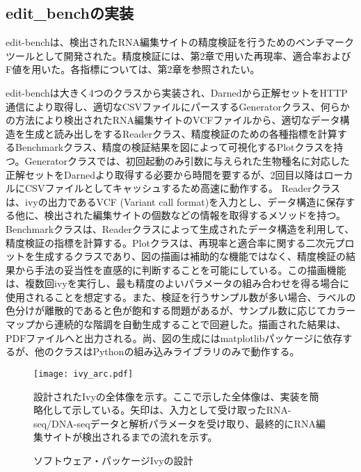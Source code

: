 \subsection{edit\_benchの実装}
edit-benchは、検出されたRNA編集サイトの精度検証を行うためのベンチマークツールとして開発された。精度検証には、第2章で用いた再現率、適合率およびF値を用いた。各指標については、第2章を参照されたい。
\par
edit-benchは大きく4つのクラスから実装され、Darnedから正解セットをHTTP通信により取得し、適切なCSVファイルにパースするGeneratorクラス、何らかの方法により検出されたRNA編集サイトのVCFファイルから、適切なデータ構造を生成と読み出しをするReaderクラス、精度検証のための各種指標を計算するBenchmarkクラス、精度の検証結果を図によって可視化するPlotクラスを持つ。Generatorクラスでは、初回起動のみ引数に与えられた生物種名に対応した正解セットをDarnedより取得する必要から時間を要するが、2回目以降はローカルにCSVファイルとしてキャッシュするため高速に動作する。
Readerクラスは、ivyの出力であるVCF (Variant call format)を入力とし、データ構造に保存する他に、検出された編集サイトの個数などの情報を取得するメソッドを持つ。Benchmarkクラスは、Readerクラスによって生成されたデータ構造を利用して、精度検証の指標を計算する。Plotクラスは、再現率と適合率に関する二次元プロットを生成するクラスであり、図の描画は補助的な機能ではなく、精度検証の結果から手法の妥当性を直感的に判断することを可能にしている。この描画機能は、複数回ivyを実行し、最も精度のよいパラメータの組み合わせを得る場合に使用されることを想定する。また、検証を行うサンプル数が多い場合、ラベルの色分けが離散的であると色が飽和する問題があるが、サンプル数に応じてカラーマップから連続的な階調を自動生成することで回避した。描画された結果は、PDFファイルへと出力される。尚、図の生成にはmatplotlibパッケージに依存するが、他のクラスはPythonの組み込みライブラリのみで動作する。
\begin{figure}[!h]
	\begin{center}
		\texttt{[image: ivy\_arc.pdf]}
	\end{center}
	\vspace*{-1cm}
	\caption{ソフトウェア・パッケージIvyの設計}
	\label{fig:ivy_arch}
	\begin{flushleft}
		\small{設計されたIvyの全体像を示す。ここで示した全体像は、実装を簡略化して示している。矢印は、入力として受け取ったRNA-seq/DNA-seqデータと解析パラメータを受け取り、最終的にRNA編集サイトが検出されるまでの流れを示す。}
	\end{flushleft}
\end{figure}


